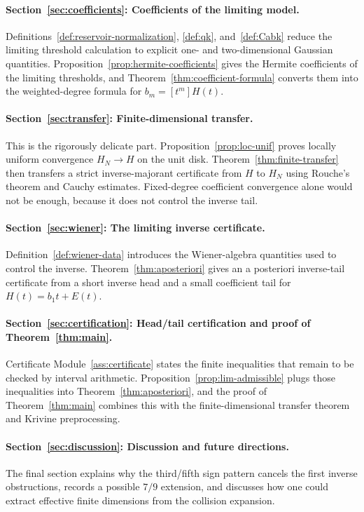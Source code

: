 \documentclass[11pt]{article}
\newcommand{\1}{\mathbf 1}
\theoremstyle{plain}
\theoremstyle{definition}
\theoremstyle{remark}
\begin{document}
\paragraph{Section~\ref{sec:coefficients}: Coefficients of the limiting model.}
Definitions~\ref{def:reservoir-normalization}, \ref{def:qk}, and~\ref{def:Cabk} reduce the limiting threshold calculation to explicit one- and two-dimensional Gaussian quantities.  Proposition~\ref{prop:hermite-coefficients} gives the Hermite coefficients of the limiting thresholds, and Theorem~\ref{thm:coefficient-formula} converts them into the weighted-degree formula for $b_m=[t^m]H(t)$.

\paragraph{Section~\ref{sec:transfer}: Finite-dimensional transfer.}
This is the rigorously delicate part.  Proposition~\ref{prop:loc-unif} proves locally uniform convergence $H_N\to H$ on the unit disk.  Theorem~\ref{thm:finite-transfer} then transfers a strict inverse-majorant certificate from $H$ to $H_N$ using Rouche's theorem and Cauchy estimates.  Fixed-degree coefficient convergence alone would not be enough, because it does not control the inverse tail.

\paragraph{Section~\ref{sec:wiener}: The limiting inverse certificate.}
Definition~\ref{def:wiener-data} introduces the Wiener-algebra quantities used to control the inverse.  Theorem~\ref{thm:aposteriori} gives an a posteriori inverse-tail certificate from a short inverse head and a small coefficient tail for $H(t)=b_1t+E(t)$.

\paragraph{Section~\ref{sec:certification}: Head/tail certification and proof of Theorem~\ref{thm:main}.}
Certificate Module~\ref{ass:certificate} states the finite inequalities that remain to be checked by interval arithmetic.  Proposition~\ref{prop:lim-admissible} plugs those inequalities into Theorem~\ref{thm:aposteriori}, and the proof of Theorem~\ref{thm:main} combines this with the finite-dimensional transfer theorem and Krivine preprocessing.

\paragraph{Section~\ref{sec:discussion}: Discussion and future directions.}
The final section explains why the third/fifth sign pattern cancels the first inverse obstructions, records a possible $7/9$ extension, and discusses how one could extract effective finite dimensions from the collision expansion.
\end{document}
